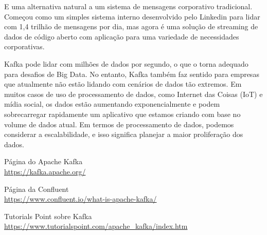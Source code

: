 \documentclass[a4paper,11pt]{article}
\begin{document}
E uma alternativa natural a um sistema de mensagens corporativo tradicional. Começou como um simples sistema interno desenvolvido pelo Linkedin para lidar com 1,4 trilhão de mensagens por dia, mas agora é uma solução de streaming de dados de código aberto com aplicação para uma variedade de necessidades corporativas. 

Kafka pode lidar com milhões de dados por segundo, o que o torna adequado para desafios de Big Data. No entanto, Kafka também faz sentido para empresas que atualmente não estão lidando com cenários de dados tão extremos. Em muitos casos de uso de processamento de dados, como Internet das Coisas (IoT) e mídia social, os dados estão aumentando exponencialmente e podem sobrecarregar rapidamente um aplicativo que estamos criando com base no volume de dados atual. Em termos de processamento de dados, podemos considerar a escalabilidade, e isso significa planejar a maior proliferação dos dados. 



\begin{thebibliography}{4}
	Página do Apache Kafka \\
	\url{https://kafka.apache.org/}

	Página da Confluent \\
	\url{https://www.confluent.io/what-is-apache-kafka/}
	
	Tutorials Point sobre Kafka \\
	\url{https://www.tutorialspoint.com/apache_kafka/index.htm}	
	
	
\end{thebibliography}
\end{document}
